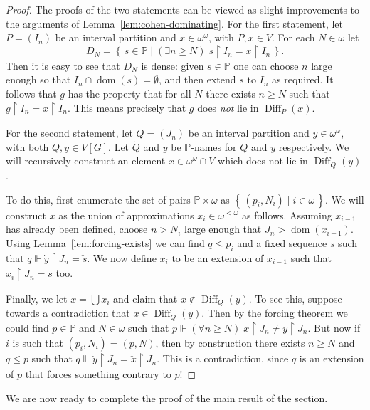 \documentclass[11pt,oneside]{amsbook}
\newcommand{\set}[1]{\left\{\,#1\,\right\}}
\newcommand{\PP}{\mathbb P}
\newcommand{\forces}{\Vdash}
\DeclareMathOperator{\dom}{dom}
\DeclareMathOperator{\Diff}{Diff}
\theoremstyle{definition}
\theoremstyle{plain}
\theoremstyle{definition}
\theoremstyle{remark}
\begin{document}
\begin{proof}
  The proofs of the two statements can be viewed as slight improvements to the arguments of Lemma~\ref{lem:cohen-dominating}. For the first statement, let $P=(I_n)$ be an interval partition and $x\in\omega^\omega$, with $P,x\in V$. For each $N\in\omega$ let
  \[D_N=\set{s\in\PP\mid(\exists n\geq N)\;s\restriction I_n=x\restriction I_n}\text{.}
  \]
  Then it is easy to see that $D_N$ is dense: given $s\in\PP$ one can choose $n$ large enough so that $I_n\cap\dom(s)=\emptyset$, and then extend $s$ to $I_n$ as required. It follows that $g$ has the property that for all $N$ there exists $n\geq N$ such that $g\restriction I_n=x\restriction I_n$. This means precisely that $g$ does \emph{not} lie in $\Diff_P(x)$.

  For the second statement, let $Q=(J_n)$ be an interval partition and $y\in\omega^\omega$, with both $Q,y\in V[G]$. Let $\dot Q$ and $\dot y$ be $\PP$-names for $Q$ and $y$ respectively. We will recursively construct an element $x\in\omega^\omega\cap V$ which does not lie in $\Diff_Q(y)$.

  To do this, first enumerate the set of pairs $\PP\times\omega$ as $\set{(p_i,N_i)\mid i\in\omega}$. We will construct $x$ as the union of approximations $x_i\in\omega^{<\omega}$ as follows. Assuming $x_{i-1}$ has already been defined, choose $n>N_i$ large enough that $J_n>\dom(x_{i-1})$. Using Lemma~\ref{lem:forcing-exists} we can find $q\leq p_i$ and a fixed sequence $s$ such that $q\forces \dot y\restriction J_n=\check s$. We now define $x_i$ to be an extension of $x_{i-1}$ such that $x_i\restriction J_n=s$ too.

  Finally, we let $x=\bigcup x_i$ and claim that $x\notin\Diff_Q(y)$. To see this, suppose towards a contradiction that $x\in\Diff_Q(y)$. Then by the forcing theorem we could find $p\in\PP$ and $N\in\omega$ such that $p\forces(\forall n\geq N)\;x\restriction J_n\neq y\restriction J_n$. But now if $i$ is such that $(p_i,N_i)=(p,N)$, then by construction there exists $n\geq N$ and $q\leq p$ such that $q\forces\dot y\restriction J_n=\check x\restriction J_n$. This is a contradiction, since $q$ is an extension of $p$ that forces something contrary to $p$!
\end{proof}


We are now ready to complete the proof of the main result of the section.
\end{document}
